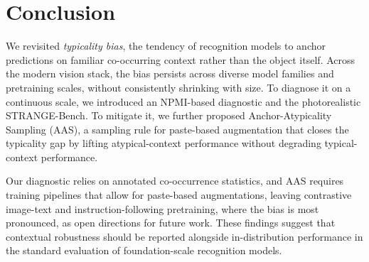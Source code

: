 \section{Conclusion}
\vspace{-8pt}
We revisited \emph{typicality bias}, the tendency of recognition models to anchor predictions on familiar co-occurring context rather than the object itself. Across the modern vision stack, the bias persists across diverse model families and pretraining scales, without consistently shrinking with size. To diagnose it on a continuous scale, we introduced an NPMI-based diagnostic and the photorealistic STRANGE-Bench. To mitigate it, we further proposed Anchor-Atypicality Sampling (AAS), a sampling rule for paste-based augmentation that closes the typicality gap by lifting atypical-context performance without degrading typical-context performance.

Our diagnostic relies on annotated co-occurrence statistics, and AAS requires training pipelines that allow for paste-based augmentations, leaving contrastive image-text and instruction-following pretraining, where the bias is most pronounced, as open directions for future work. These findings suggest that contextual robustness should be reported alongside in-distribution performance in the standard evaluation of foundation-scale recognition models.
